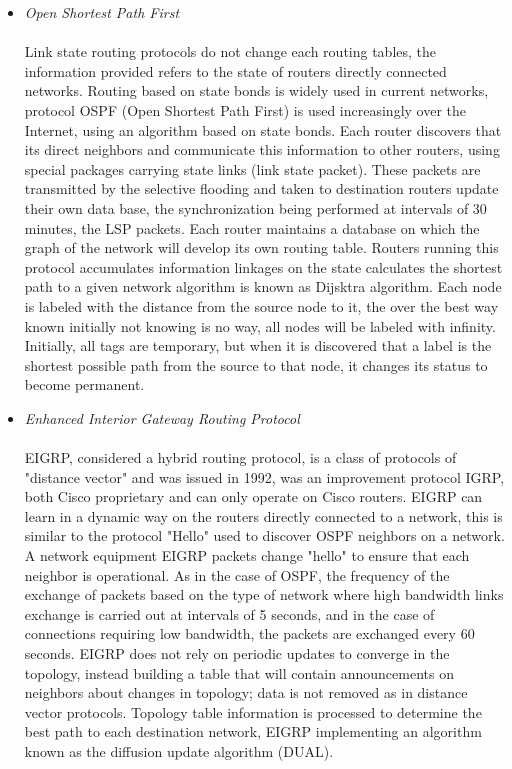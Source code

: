 \documentclass[conference,compsoc]{IEEEtran}
\begin{document}
\begin{itemize}
\item 
\emph{Open Shortest Path First}\\\\
Link state routing protocols do not change each routing tables, the information provided refers to the state of routers directly connected networks. Routing based on state bonds is widely used in current networks, protocol OSPF (Open Shortest Path First) is used increasingly over the Internet, using an algorithm based on state bonds. Each router discovers that its direct neighbors and communicate this information to other routers, using special packages carrying state links (link state packet). These packets are transmitted by the selective flooding and taken to destination routers update their own data base, the synchronization being performed at intervals of 30 minutes, the LSP packets. Each router maintains a database on which the graph of the network will develop its own routing table. Routers running this protocol accumulates information linkages on the state calculates the shortest path to a given network algorithm is known as Dijsktra algorithm. Each node is labeled with the distance from the source node to it, the over the best way known initially not knowing is no way, all nodes will be labeled with infinity. Initially, all tags are temporary, but when it is discovered that a label is the shortest possible path from the source to that node, it changes its status to become permanent.\\

\item 
\emph{Enhanced Interior Gateway Routing Protocol}\\\\
EIGRP, considered a hybrid routing protocol, is a class of protocols of "distance vector" and was issued in 1992, was an improvement protocol IGRP, both Cisco proprietary and can only operate on Cisco routers. EIGRP can learn in a dynamic way on the routers directly connected to a network, this is similar to the protocol "Hello" used to discover OSPF neighbors on a network. A network equipment EIGRP packets change "hello" to ensure that each neighbor is operational. As in the case of OSPF, the frequency of the exchange of packets based on the type of network where high bandwidth links exchange is carried out at intervals of 5 seconds, and in the case of connections requiring low bandwidth, the packets are exchanged every 60 seconds. EIGRP does not rely on periodic updates to converge in the topology, instead building a table that will contain announcements on neighbors about changes in topology; data is not removed as in distance vector protocols. Topology table information is processed to determine the best path to each destination network, EIGRP implementing an algorithm known as the diffusion update algorithm (DUAL).\\


\end{itemize}
\end{document}
